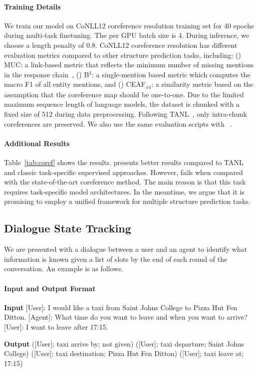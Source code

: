 \paragraph{Training Details} 
We train our model on CoNLL12 coreference resolution training set for 40 epochs during multi-task finetuning. The per GPU batch size is 4. During inference, we choose a length penalty of 0.8. CoNLL12 coreference resolution has different evaluation metrics compared to other structure prediction tasks, including: (\expandafter{}) MUC: a link-based metric that reflects the minimum number of missing mentions in the response chain~\cite{moosavi2016coreference}, (\expandafter{}) B$^3$: a single-mention based metric which computes the macro F1 of all entity mentions, and (\expandafter{}) CEAF$_{\phi 4}$: a similarity metric based on the assumption that the coreference map should be one-to-one.
Due to the limited maximum sequence length of language models, the dataset is chunked with a fixed size of 512 during data preprocessing. Following TANL~\cite{paolini2021structured}, only intra-chunk coreferences are preserved. We also use the same evaluation scripts with ~\cite{paolini2021structured}.

\paragraph{Additional Results}
Table~\ref{tab:coref} shows the results. \method presents better results compared to TANL and classic task-specific supervised approaches. However, \method fails when compared with the state-of-the-art coreference method. The main reason is that this task requires task-specific model architectures. In the meantime, we argue that it is promising to employ a unified framework for multiple structure prediction tasks.

\subsection{Dialogue State Tracking}
We are presented with a dialogue between a user and an agent to identify what information is known given a list of slots by the end of each round of the conversation. An example is as follows.

\paragraph{Input and Output Format}
\begin{enumerate*}
    \item[] {\bf Input} [User]: I would like a taxi from Saint Johns College to Pizza Hut Fen Ditton. [Agent]: What time do you want to leave and when you want to arrive? [User]: I want to leave after 17:15.
    \item[] {\bf Output} ([User]; taxi arrive by; not given) ([User]; taxi departure; Saint Johns College) ([User]; taxi destination; Pizza Hut Fen Ditton) ([User]; taxi leave at; 17:15)
\end{enumerate*}

